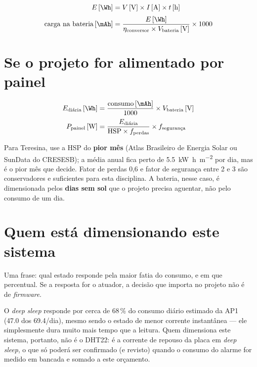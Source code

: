 \begin{align*}
  E\,[\si{\Wh}] &= V\,[\si{\volt}] \times I\,[\si{\ampere}] \times t\,[\si{\hour}] \\[2pt]
  \text{carga na bateria}\,[\si{\mAh}] &=
    \frac{E\,[\si{\Wh}]}{\eta_{\text{conversor}} \times V_{\text{bateria}}\,[\si{\volt}]}
    \times 1000
\end{align*}

\section*{Se o projeto for alimentado por painel}
{}

\begin{align*}
  E_{\text{diária}}\,[\si{\Wh}] &=
    \frac{\text{consumo}\,[\si{\mAh}]}{1000} \times V_{\text{bateria}}\,[\si{\volt}] \\[2pt]
  P_{\text{painel}}\,[\si{\watt}] &=
    \frac{E_{\text{diária}}}{\text{HSP} \times f_{\text{perdas}}} \times f_{\text{segurança}}
\end{align*}

\begin{orientacao}
Para Teresina, use a HSP do \textbf{pior mês} (Atlas Brasileiro de
Energia Solar ou SunData do CRESESB); a média anual fica perto de
\SI{5.5}{\kilo\watt\hour\per\square\metre} por dia, mas é o pior mês que
decide. Fator de perdas 0,6 e fator de segurança entre 2 e 3 são
conservadores e suficientes para esta disciplina. A bateria, nesse caso,
é dimensionada pelos \textbf{dias sem sol} que o projeto precisa
aguentar, não pelo consumo de um dia.
\end{orientacao}

\section*{Quem está dimensionando este sistema}
{}

\begin{orientacao}
Uma frase: qual estado responde pela maior fatia do consumo, e em que
percentual. Se a resposta for o atuador, a decisão que importa no
projeto não é de \emph{firmware}.
\end{orientacao}

O \emph{deep sleep} responde por cerca de 68\,\% do consumo diário
estimado da AP1 (\SI{47.0}{\mAh} dos \SI{69.4}{\mAh}/dia), mesmo sendo o
estado de menor corrente instantânea --- ele simplesmente dura muito
mais tempo que a leitura. Quem dimensiona este sistema, portanto, não
é o DHT22: é a corrente de repouso da placa em \emph{deep sleep}, o
que só poderá ser confirmado (e revisto) quando o consumo do alarme
for medido em bancada e somado a este orçamento.

